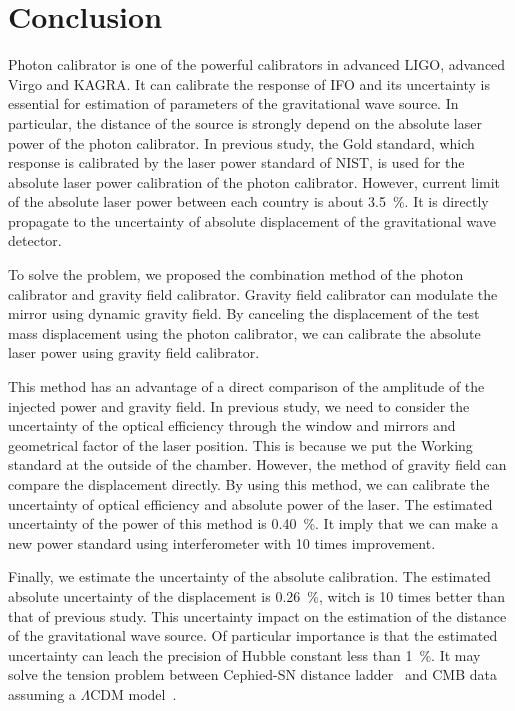 \documentclass[A4]{spie}  %
\begin{document}
\section{Conclusion}
Photon calibrator is one of the powerful calibrators in advanced LIGO, advanced Virgo and KAGRA. It can calibrate the response of IFO and its uncertainty is essential for estimation of parameters of the gravitational wave source. In particular, the distance of the source is strongly depend on the absolute laser power of the photon calibrator. In previous study, the Gold standard, which response is calibrated by the laser power standard of NIST, is used for the absolute laser power calibration of the photon calibrator. However, current limit of the absolute laser power between each country is about 3.5~\%. It is directly propagate to the uncertainty of absolute displacement of the gravitational wave detector.

To solve the problem, we proposed the combination method of the photon calibrator and gravity field calibrator. Gravity field calibrator can modulate the mirror using dynamic gravity field. By canceling the displacement of the test mass displacement using the photon calibrator, we can calibrate the absolute laser power using gravity field calibrator.

This method has an advantage of a direct comparison of the amplitude of the injected power and gravity field. In previous study, we need to consider the uncertainty of the optical efficiency through the window and mirrors  and geometrical factor of the laser position. This is because we put the Working standard at the outside of the chamber. However, the method of gravity field can compare the displacement directly. By using this method, we can calibrate the uncertainty of optical efficiency and absolute power of the laser.  The estimated uncertainty of the power of this method is 0.40~\%. It imply that we can make a new power standard using interferometer with 10 times improvement.

Finally, we estimate the uncertainty of the absolute calibration. The estimated absolute uncertainty of the displacement is 0.26~\%, witch is 10 times better than that of previous study. This uncertainty impact on the estimation of the distance of the gravitational wave source. Of particular importance is that the estimated uncertainty can leach the precision of Hubble constant less than 1~\%. It may solve the tension problem between Cephied-SN distance ladder~\cite{Riess_2016} and CMB data assuming a $\Lambda$CDM 
model~\cite{2016-planck}.
\acknowledgments     %
 
\end{document}
